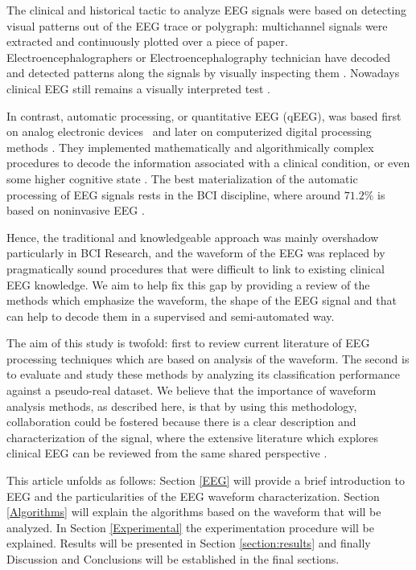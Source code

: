 \documentclass[brainsci,article,submit,moreauthors,pdftex,10pt,a4paper]{mdpi}
\begin{document}
The clinical and historical tactic to analyze EEG signals were based on detecting visual patterns out of the EEG trace or polygraph\citep{Hartman2005}: multichannel signals were extracted and continuously plotted over a piece of paper. Electroencephalographers or Electroencephalography technician have decoded and detected patterns along the signals by visually inspecting them \citep{Schomer2010}.   Nowadays clinical EEG still remains a visually interpreted test \citep{Hartman2005}.

In contrast, automatic processing, or quantitative EEG (qEEG), was based first on analog electronic devices~\citep{Jestico1977} and later on computerized digital processing methods \citep{Jansen1991}.  They implemented mathematically and algorithmically complex procedures to decode the information associated with a clinical condition, or even some higher cognitive state \citep{Yuste2017}.  The best materialization of the automatic processing of EEG signals rests in the BCI discipline, where around $71.2\%$ is based on noninvasive EEG \citep{Guger2017}.  


Hence, the traditional and knowledgeable approach was mainly overshadow particularly in BCI Research, and the waveform of the EEG was replaced by pragmatically sound procedures that were difficult to link to existing clinical EEG knowledge.  We aim to help fix this gap by providing a review of the methods which emphasize the waveform, the shape of the EEG signal and that can help to decode them in a supervised and semi-automated way.

The aim of this study is twofold: first to review current literature of EEG processing techniques which are based on analysis of the waveform.  The second is to evaluate and study these methods by analyzing its classification performance against a pseudo-real dataset. We believe that the importance of waveform analysis methods, as described here, is that by using this methodology, collaboration could be fostered because there is a clear description and characterization of the signal, where the extensive literature which explores clinical EEG can be reviewed from the same shared perspective \citep{Nijboer2009,Wei2017}. 

This article unfolds as follows: Section \ref{EEG} will provide a brief introduction to EEG and the particularities of the EEG waveform characterization.  Section \ref{Algorithms} will explain the algorithms based on the waveform that will be analyzed.  In Section \ref{Experimental} the experimentation procedure will be explained.  Results will be presented in Section \ref{section:results} and finally Discussion and Conclusions will be established in the final sections.
\end{document}
